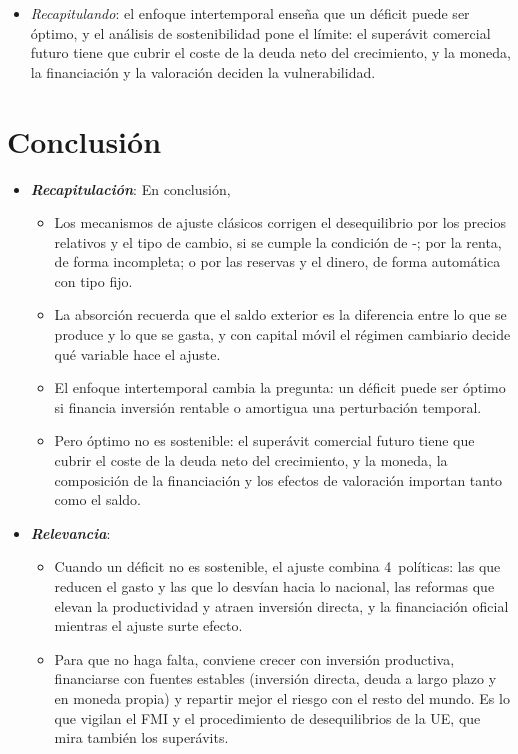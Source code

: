 \documentclass[11pt]{article}
\begin{document}
\begin{itemize}
\item \emph{Recapitulando}: el enfoque intertemporal enseña que un déficit puede ser óptimo, y el análisis de sostenibilidad pone el límite: el superávit comercial futuro tiene que cubrir el coste de la deuda neto del crecimiento, y la moneda, la financiación y la valoración deciden la vulnerabilidad.
\end{itemize}

\section*{Conclusión}

\begin{itemize}
\item \textbf{\emph{Recapitulación}}: En conclusión,
  \begin{itemize}
  \item Los mecanismos de ajuste clásicos corrigen el desequilibrio por los precios relativos y el tipo de cambio, si se cumple la condición de -; por la renta, de forma incompleta; o por las reservas y el dinero, de forma automática con tipo fijo.
  \item La absorción recuerda que el saldo exterior es la diferencia entre lo que se produce y lo que se gasta, y con capital móvil el régimen cambiario decide qué variable hace el ajuste.
  \item El enfoque intertemporal cambia la pregunta: un déficit puede ser óptimo si financia inversión rentable o amortigua una perturbación temporal.
  \item Pero óptimo no es sostenible: el superávit comercial futuro tiene que cubrir el coste de la deuda neto del crecimiento, y la moneda, la composición de la financiación y los efectos de valoración importan tanto como el saldo.
  \end{itemize}
\item \textbf{\emph{Relevancia}}:
  \begin{itemize}
  \item Cuando un déficit no es sostenible, el ajuste combina 4~políticas: las que reducen el gasto y las que lo desvían hacia lo nacional\nocite{Johnson1958}, las reformas que elevan la productividad y atraen inversión directa, y la financiación oficial mientras el ajuste surte efecto.
  \item Para que no haga falta, conviene crecer con inversión productiva, financiarse con fuentes estables (inversión directa, deuda a largo plazo y en moneda propia) y repartir mejor el riesgo con el resto del mundo. Es lo que vigilan el FMI y el procedimiento de desequilibrios de la UE, que mira también los superávits.

\end{itemize}
\end{itemize}
\end{document}
